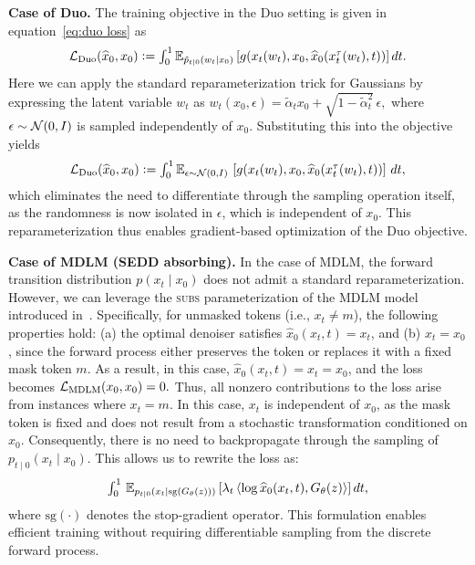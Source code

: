 \textbf{Case of Duo.} The training objective in the Duo setting is given in equation~\eqref{eq:duo loss} as
\begin{gather}
  \textstyle \mathcal{L}_{\text{Duo}}(\widehat{x}_0, x_0)\vcentcolon=
  \int_0^1 \mathbb{E}_{\tilde{p}_{t\mid 0}(w_t\mid x_0)} \left[g(x_t(w_t),x_0, \widehat{x}_0(x_t^{\tau}(w_t), t))\right]dt. \nonumber
\end{gather}
Here we can apply the standard reparameterization trick for Gaussians by expressing the latent variable $w_t$ as
$
  \textstyle w_t(x_0, \epsilon) = \tilde{\alpha}_t x_0 + \sqrt{1 - \tilde{\alpha}_t^2} \, \epsilon,
  $
where $\epsilon \sim \mathcal{N}(0, I)$ is sampled independently of $x_0$. Substituting this into the objective yields
\begin{gather}
  \textstyle \mathcal{L}_{\text{Duo}}(\widehat{x}_0, x_0)\vcentcolon=
  \int_0^1 \mathbb{E}_{\epsilon \sim \mathcal{N}(0, I)} \, \left[g(x_t(w_t),x_0, \widehat{x}_0(x_t^{\tau}(w_t), t))\right] \, dt,
\end{gather}
which eliminates the need to differentiate through the sampling operation itself, as the randomness is now isolated in $\epsilon$, which is independent of $x_0$. This reparameterization thus enables gradient-based optimization of the Duo objective.


\textbf{Case of MDLM (SEDD absorbing).} In the case of MDLM, the forward transition distribution $p(x_t \mid x_0)$ does not admit a standard reparameterization. However, we can leverage the \textsc{subs} parameterization of the MDLM model introduced in~\citep[see Section 3.2.3]{sahoo2024simple}. Specifically, for unmasked tokens (i.e., $x_t \neq m$), the following properties hold: (a) the optimal denoiser satisfies $\widehat{x}_0(x_t, t) = x_t$, and (b) $x_t = x_0$, since the forward process either preserves the token or replaces it with a fixed mask token $m$. As a result, in this case, $\widehat{x}_0(x_t, t) = x_t = x_0$, and the loss becomes $\mathcal{L}_{\text{MDLM}}(x_0, x_0) = 0.$
Thus, all nonzero contributions to the loss arise from instances where $x_t = m$. In this case, $x_t$ is independent of $x_0$, as the mask token is fixed and does not result from a stochastic transformation conditioned on $x_0$. Consequently, there is no need to backpropagate through the sampling of $p_{t \mid 0}(x_t \mid x_0)$. This allows us to rewrite the loss as:
\vspace{-1mm}
\begin{gather}
  \textstyle \int_0^1 \, \mathbb{E}_{p_{t \mid 0}(x_t \mid \text{sg}(G_{\theta}(z)))} \left[
  \lambda_t \, \langle \log \widehat{x}_0(x_t, t), G_{\theta}(z) \rangle
  \right] dt,
  \nonumber
\end{gather}
\vspace{-1mm}
where $\text{sg}(\cdot)$ denotes the stop-gradient operator. This formulation enables efficient training without requiring differentiable sampling from the discrete forward process.


